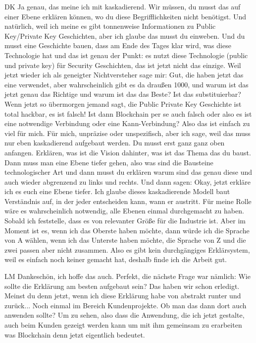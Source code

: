 \begin{xlist}
     \item[DK] Ja genau, das meine ich mit kaskadierend. Wir müssen, du musst das auf einer Ebene erklären können, wo du diese Begrifflichkeiten nicht benötigst. Und natürlich, weil ich meine es gibt tonnenweise Informationen zu Public Key/Private Key Geschichten, aber ich glaube das musst du einweben. Und du musst eine Geschichte bauen, dass am Ende des Tages klar wird, was diese Technologie hat und das ist genau der Punkt: es nutzt diese Technologie (public und private key) für Security Geschichten, das ist jetzt nicht das einzige. Weil jetzt wieder ich als geneigter Nichtversteher sage mir: Gut, die haben jetzt das eine verwendet, aber wahrscheinlich gibt es da draußen 1000, und warum ist das jetzt genau das Richtige und warum ist das das Beste? Ist das substituierbar? Wenn jetzt so übermorgen jemand sagt, die Public Private Key Geschichte ist total hackbar, es ist falsch! Ist dann Blockchain per se auch falsch oder also es ist eine notwendige Verbindung oder eine Kann-Verbindung? Also das ist einfach zu viel für mich. Für mich, unpräzise oder unspezifisch, aber ich sage, weil das muss nur eben kaskadierend aufgebaut werden. Du musst erst ganz ganz oben anfangen. Erklären, was ist die Vision dahinter, was ist das Thema das du baust. Dann muss man eine Ebene tiefer gehen, also was sind die Bausteine technologischer Art und dann musst du erklären warum sind das genau diese und auch wieder abgrenzend zu links und rechts. Und dann sagen: Okay, jetzt erkläre ich es euch eine Ebene tiefer. Ich glaube dieses kaskadierende Modell baut Verständnis auf, in der jeder entscheiden kann, wann er austritt. Für meine Rolle wäre es wahrscheinlich notwendig, alle Ebenen einmal durchgemacht zu haben. Sobald ich feststelle, dass es von relevanter Größe für die Industrie ist. Aber im Moment ist es, wenn ich das Oberste haben möchte, dann würde ich die Sprache von A wählen, wenn ich das Unterste haben möchte, die Sprache von Z und die zwei passen aber nicht zusammen. Also es gibt kein durchgängiges Erklärsystem, weil es einfach noch keiner gemacht hat, deshalb finde ich die Arbeit gut. 
     \item[LM] Dankeschön, ich hoffe das auch. Perfekt, die nächste Frage war nämlich: Wie sollte die Erklärung am besten aufgebaut sein? Das haben wir schon erledigt. Meinst du denn jetzt, wenn ich diese Erklärung habe von abstrakt runter und zurück... Noch einmal im Bereich Kundenprojekte. Ob man das dann dort auch anwenden sollte? Um zu sehen, also dass die Anwendung, die ich jetzt gestalte, auch beim Kunden gezeigt werden kann um mit ihm gemeinsam zu erarbeiten was Blockchain denn jetzt eigentlich bedeutet.

\end{xlist}
